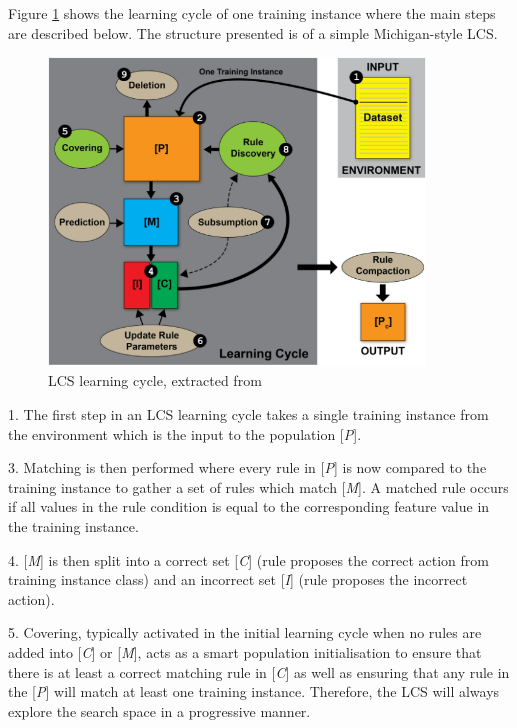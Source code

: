 Figure \ref{fig:learningCycle} shows the learning cycle of one training instance where the main steps are described below. The structure presented is of a simple Michigan-style LCS.
\begin{figure}
	\begin{center}
		\includegraphics[width=100mm, scale=0.5]{LCScycle.png}
		\caption{LCS learning cycle, extracted from \cite{urbanowicz2017introduction}}
		\label{fig:learningCycle}
	\end{center}
\end{figure}


1.	The first step in an LCS learning cycle takes a single training instance from the environment which is the input to the population [\textit{P}].  

3. 	Matching is then performed where every rule in [\textit{P}] is now compared to the training instance to gather a set of rules which match [\textit{M}]. A matched rule occurs if all values in the rule condition is equal to the corresponding feature value in the training instance. 

4.	[\textit{M}] is then split into a correct set [\textit{C}] (rule proposes the correct action from training instance class) and an incorrect set [\textit{I}] (rule proposes the incorrect action). 

5.  Covering, typically activated in the initial learning cycle when no rules are added into  [\textit{C}] or [\textit{M}], acts as a smart population initialisation to ensure that there is at least a correct matching rule in [\textit{C}] as well as ensuring that any rule in the [\textit{P}] will match at least one training instance. Therefore, the LCS will always explore the search space in a progressive manner.

